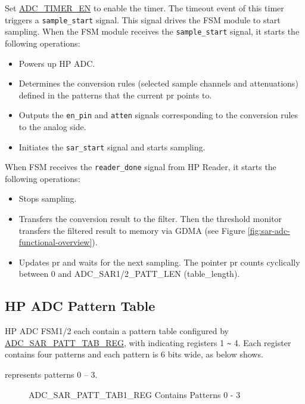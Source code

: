 \documentclass[main\_\_EN.tex]{subfiles}
\begin{document}
Set \hyperref[fielddesc:ADCTIMEREN]{ADC\_TIMER\_EN} to enable the timer. The timeout event of this timer triggers a \texttt{sample\_start} signal. This signal drives the FSM module to start sampling. When the FSM module receives the \texttt{sample\_start} signal, it starts the following operations:

\begin{itemize}
    \item Powers up HP ADC.
    \item Determines the conversion rules (selected sample channels and attenuations) defined in the patterns that the current pr points to.
    \item Outputs the \texttt{en\_pin} and \texttt{atten} signals corresponding to the conversion rules to the analog side.
    \item Initiates the \texttt{sar\_start} signal and starts sampling.
\end{itemize}

When FSM receives the \texttt{reader\_done} signal from HP Reader, it starts the following operations:
    \begin{itemize}
        \item Stops sampling.
        \item Transfers the conversion result to the filter. Then the threshold monitor transfers the filtered result to memory via GDMA (see Figure \ref{fig:sar-adc-functional-overview}).
        \item Updates pr and waits for the next sampling. The pointer pr counts cyclically between 0 and ADC\_SAR1/2\_PATT\_LEN (table\_length).
    \end{itemize}

\subsection{HP ADC Pattern Table}\label{sec:adc_pattern}

HP ADC FSM1/2 each contain a pattern table configured by \hyperref[regdesc:ADCSAR1PATTTAB1REG]{ADC\_SAR\_PATT\_TAB\_REG}, with  indicating registers 1 \verb+~+ 4. Each register contains four patterns and each pattern is 6 bits wide, as below shows.

%
%
%
%
%
\begin{regdesc}\begin{reglist}
\item [cmd \regindex{n} (\regindex{n} = 0 - 3)] represents patterns 0 – 3.
\end{reglist}\end{regdesc}
\vspace{-2em}
\begin{figure}[H]
    \centering
    \caption{ADC\_SAR\_PATT\_TAB1\_REG Contains Patterns 0 - 3}
    \label{fig:pattern-tab-1}
\end{figure}
\end{document}
